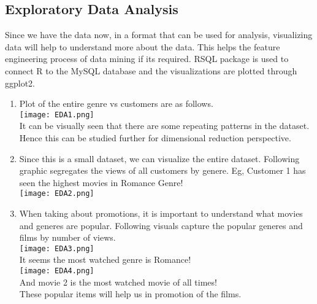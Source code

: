 \documentclass{article}
\begin{document}
\subsection*{Exploratory Data Analysis}
Since we have the data now, in a format that can be used for analysis, visualizing data will help to understand more about the data. This helps the feature engineering process of data mining if its required. RSQL package is used to connect R to the MySQL database and the visualizations are plotted through ggplot2.\\
\begin{enumerate}
\item Plot of the entire genre vs customers are as follows.\\
\texttt{[image: EDA1.png]}\\
It can be visually seen that there are some repeating patterns in the dataset. Hence this can be studied further for dimensional reduction perspective.
\item Since this is a small dataset, we can visualize the entire dataset. Following graphic segregates the views of all customers by genere. Eg, Customer 1 has seen the highest movies in Romance Genre!\\
\texttt{[image: EDA2.png]}\\
\item When taking about promotions, it is important to understand what movies and generes are popular. Following visuals capture the popular generes and films by number of views.\\
\texttt{[image: EDA3.png]}\\
It seems the most watched genre is Romance!\\
\texttt{[image: EDA4.png]}\\
And movie 2 is the most watched movie of all times!\\
These popular items will help us in promotion of the films.
\end{enumerate}
\end{document}
